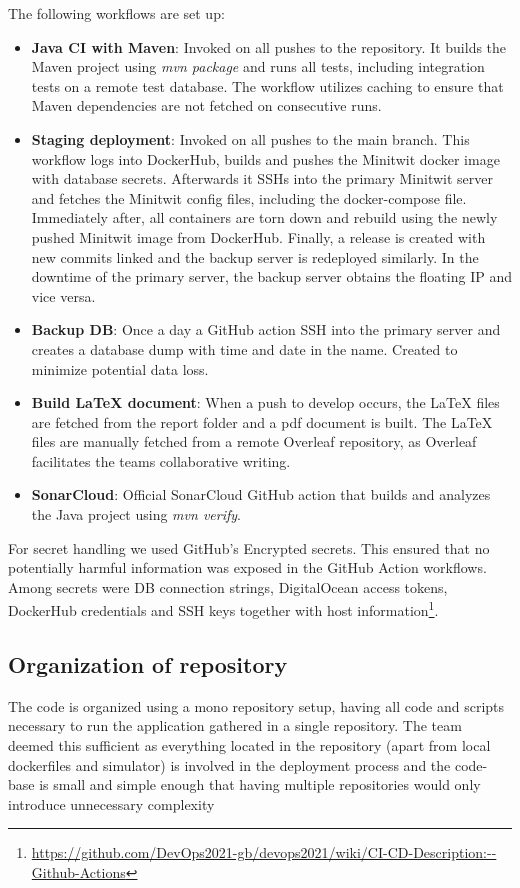 The following workflows are set up:
\begin{itemize}
    \item \textbf{Java CI with Maven}: Invoked on all pushes to the repository. It builds the Maven project using \textit{mvn package} and runs all tests, including integration tests on a remote test database. The workflow utilizes caching to ensure that Maven dependencies are not fetched on consecutive runs. 
    \item \textbf{Staging deployment}: Invoked on all pushes to the main branch. This workflow logs into DockerHub, builds and pushes the Minitwit docker image with database secrets. Afterwards it SSHs into the primary Minitwit server and fetches the Minitwit config files, including the docker-compose file. Immediately after, all containers are torn down and rebuild using the newly pushed Minitwit image from DockerHub. Finally, a release is created with new commits linked and the backup server is redeployed similarly. In the downtime of the primary server, the backup server obtains the floating IP and vice versa. 
    \item \textbf{Backup DB}: Once a day a GitHub action SSH into the primary server and creates a database dump with time and date in the name. Created to minimize potential data loss.
    \item \textbf{Build LaTeX document}: When a push to develop occurs, the LaTeX files are fetched from the report folder and a pdf document is built. The LaTeX files are manually fetched from a remote Overleaf repository, as Overleaf facilitates the teams collaborative writing. 
    \item \textbf{SonarCloud}: Official SonarCloud GitHub action that builds and analyzes the Java project using \textit{mvn verify}. 
\end{itemize}
For secret handling we used GitHub's Encrypted secrets. This ensured that no potentially harmful information was exposed in the GitHub Action workflows. Among secrets were DB connection strings, DigitalOcean access tokens, DockerHub credentials and SSH keys together with host information\footnote{\url{https://github.com/DevOps2021-gb/devops2021/wiki/CI-CD-Description:--Github-Actions}}.


\subsection{Organization of repository}
The code is organized using a mono repository setup, having all code and scripts necessary to run the application gathered in a single repository. The team deemed this sufficient as everything located in the repository (apart from local dockerfiles and simulator) is involved in the deployment process and the code-base is small and simple enough that having multiple repositories would only introduce unnecessary complexity


